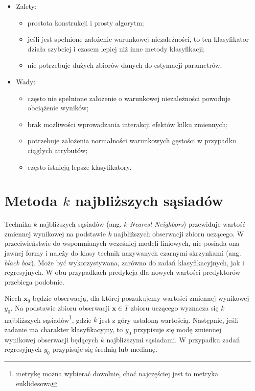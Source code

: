 \documentclass[
]{book}
\providecommand{\tightlist}{%
  \setlength{\itemsep}{0pt}\setlength{\parskip}{0pt}}
\theoremstyle{plain}
\theoremstyle{definition}
\theoremstyle{definition}
\theoremstyle{definition}
\theoremstyle{definition}
\theoremstyle{remark}
\begin{document}
\begin{itemize}
\tightlist
\item
  Zalety:

  \begin{itemize}
  \tightlist
  \item
    prostota konstrukcji i prosty algorytm;
  \item
    jeśli jest spełnione założenie warunkowej niezależności, to ten klasyfikator działa szybciej i czasem lepiej niż inne metody klasyfikacji;
  \item
    nie potrzebuje dużych zbiorów danych do estymacji parametrów;
  \end{itemize}
\item
  Wady:

  \begin{itemize}
  \tightlist
  \item
    często nie spełnione założenie o warunkowej niezależności powoduje obciążenie wyników;
  \item
    brak możliwości wprowadzania interakcji efektów kilku zmiennych;
  \item
    potrzebuje założenia normalności warunkowych gęstości w przypadku ciągłych atrybutów;
  \item
    często istnieją lepsze klasyfikatory.
  \end{itemize}
\end{itemize}

\hypertarget{metoda-k-najbliux17cszych-sux105siaduxf3w}{%
\chapter{\texorpdfstring{Metoda \(k\) najbliższych sąsiadów}{Metoda k najbliższych sąsiadów}}\label{metoda-k-najbliux17cszych-sux105siaduxf3w}}

Technika \(k\) najbliższych sąsiadów (ang. \emph{\(k\)-Nearest Neighbors}) przewiduje wartość zmiennej wynikowej na podstawie \(k\) najbliższych obserwacji zbioru uczącego. W przeciwieństwie do wspomnianych wcześniej modeli liniowych, nie posiada ona jawnej formy i należy do klasy technik nazywanych czarnymi skrzynkami (ang. \emph{black box}). Może być wykorzystywana, zarówno do zadań klasyfikacyjnych, jak i regresyjnych. W obu przypadkach predykcja dla nowych wartości predyktorów przebiega podobnie.

Niech \(\boldsymbol x_0\) będzie obserwacją, dla której poszukujemy wartości zmiennej wynikowej \(y_0\). Na podstawie zbioru obserwacji \(\boldsymbol x\in T\) zbioru uczącego wyznacza się \(k\) najbliższych sąsiadów\footnote{metrykę można wybierać dowolnie, choć najczęściej jest to metryka euklidesowa}, gdzie \(k\) jest z góry ustaloną wartością. Następnie, jeśli zadanie ma charakter klasyfikacyjny, to \(y_0\) przypisuje się modę zmiennej wynikowej obserwacji będących \(k\) najbliższymi sąsiadami. W przypadku zadań regresyjnych \(y_0\) przypisuje się średnią lub medianę.
\end{document}
